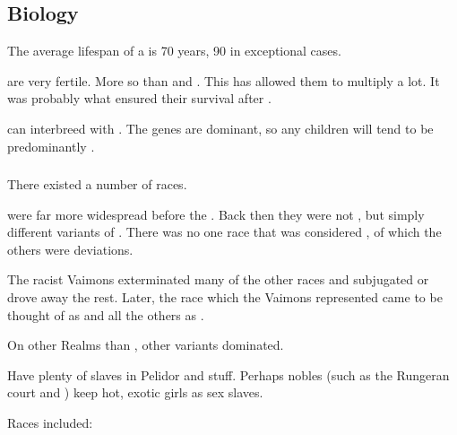 \subsection{Biology}
The average lifespan of a \human{} is 70 years, 90 in exceptional cases. 

\Humans{} are very fertile. 
More so than \scathae{} and \nephilim. 
This has allowed them to multiply a lot. 
It was probably what ensured their survival after . 

\Humans{} can interbreed with \nephilim. 
The \human{} genes are dominant, so any children will tend to be predominantly \human. 





\subsubsection{\Demihumans}
There existed a number of \quo{\demihuman} races. 

\Demihumans were far more widespread before the \VaimonCaliphate. 
Back then they were not \quo{\demihumans}, but simply different variants of \humans.
There was no one race that was considered  \humans, of which the others were deviations. 

The racist Vaimons exterminated many of the other \human races and subjugated or drove away the rest. 
Later, the race which the Vaimons represented came to be thought of as  \humans and all the others as \demihumans. 

On other Realms than \Azmith, other \human variants dominated.

Have plenty of \demihuman slaves in Pelidor and stuff. 
Perhaps nobles (such as the Rungeran court and \ishrah) keep hot, exotic \demihuman girls as sex slaves. 

Races included:

